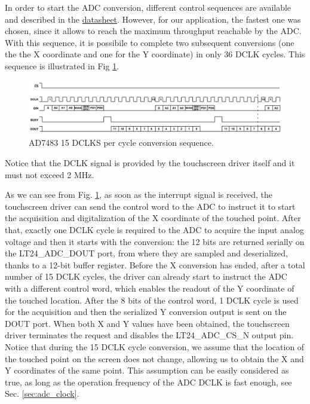 \documentclass[11pt]{report}
\begin{document}
In order to start the ADC conversion, different control sequences are available and described in the \href{https://www.analog.com/media/en/technical-documentation/data-sheets/AD7843.pdf}{datasheet}. However, for our application, the fastest one was chosen, since it allows to reach the maximum throughput reachable by the ADC. With this sequence, it is possibile to complete two subsequent conversions (one the the X coordinate and one for the Y coordinate) in only 36 DCLK cycles. This sequence is illustrated in Fig \ref{fig:ad7483_sequence}.

\begin{figure}[!h]
    \centering
    \includegraphics[width=1\linewidth]{images/graphic_interface_design/LT24_touchscreen_driver/ad7843_sequence.png}
    \caption{AD7483 15 DCLKS per cycle conversion sequence.}
    \label{fig:ad7483_sequence}
\end{figure}

Notice that the DCLK signal is provided by the touchscreen driver itself and it must not exceed 2 MHz.

As we can see from Fig. \ref{fig:ad7483_sequence}, as soon as the interrupt signal is received, the touchscreen driver can send the control word to the ADC to instruct it to start the acquisition and digitalization of the X coordinate of the touched point. After that, exactly one DCLK cycle is required to the ADC to acquire the input analog voltage and then it starts with the conversion: the 12 bits are returned serially on the LT24\_ADC\_DOUT port, from where they are sampled and deserialized, thanks to a 12-bit buffer register. Before the X conversion has ended, after a total number of 15 DCLK cycles, the driver can already start to instruct the ADC with a different control word, which enables the readout of the Y coordinate of the touched location. After the 8 bits of the control word, 1 DCLK cycle is used for the acquisition and then the serialized Y conversion output is sent on the DOUT port. When both X and Y values have been obtained, the touchscreen driver terminates the request and disables the LT24\_ADC\_CS\_N output pin. Notice that during the 15 DCLK cycle conversion, we assume that the location of the touched point on the screen does not change, allowing us to obtain the X and Y coordinates of the same point. This assumption can be easily considered as true, as long as the operation frequency of the ADC DCLK is fast enough, see Sec. \ref{sec:adc_clock}.
\end{document}
